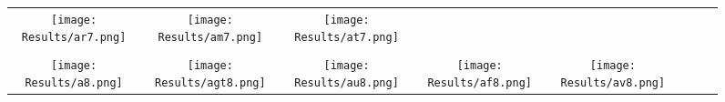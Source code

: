 \documentclass[journal]{IEEEtran}
\begin{document}
\begin{figure*}[!t]
\begin{tabular}{cccccccc}
		\hspace{0.4cm}
		\begin{minipage}{32pt}
			\texttt{[image: Results/ar7.png]}
\end{minipage}
		&
		\hspace{0.4cm}
		\begin{minipage}{32pt}
			\texttt{[image: Results/am7.png]}
\end{minipage}
		&
		\hspace{0.4cm}
		\begin{minipage}{32pt}
			\texttt{[image: Results/at7.png]}
\end{minipage}
		\\
		\\
		\begin{minipage}{32pt}
			\texttt{[image: Results/a8.png]}
\end{minipage}
		&
		\hspace{0.4cm}
		\begin{minipage}{32pt}
			\texttt{[image: Results/agt8.png]}
\end{minipage}
		&
		\hspace{0.4cm}
		\begin{minipage}{30pt}
			\texttt{[image: Results/au8.png]}
\end{minipage}
		&
		\hspace{0.4cm}
		\begin{minipage}{30pt}
			\texttt{[image: Results/af8.png]}
\end{minipage}
		&
		\hspace{0.4cm}
		\begin{minipage}{30pt}
			\texttt{[image: Results/av8.png]}
\end{minipage}
		&
	

\end{tabular}
\end{figure*}
\end{document}
